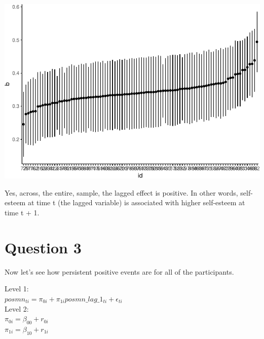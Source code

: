\documentclass[]{article}
\newenvironment{Shaded}{\begin{snugshade}}{\end{snugshade}}
\newcommand{\KeywordTok}[1]{\textcolor[rgb]{0.13,0.29,0.53}{\textbf{#1}}}
\newcommand{\DataTypeTok}[1]{\textcolor[rgb]{0.13,0.29,0.53}{#1}}
\newcommand{\FloatTok}[1]{\textcolor[rgb]{0.00,0.00,0.81}{#1}}
\newcommand{\StringTok}[1]{\textcolor[rgb]{0.31,0.60,0.02}{#1}}
\newcommand{\OperatorTok}[1]{\textcolor[rgb]{0.81,0.36,0.00}{\textbf{#1}}}
\newcommand{\NormalTok}[1]{#1}
\begin{document}
\includegraphics{Beck_HW_7_files/figure-latex/unnamed-chunk-4-1.pdf}

\begin{Shaded}
\end{Shaded}

Yes, across, the entire, sample, the lagged effect is positive. In other
words, self-esteem at time t (the lagged variable) is associated with
higher self-esteem at time t + 1.

\section{Question 3}\label{question-3}

Now let's see how persistent positive events are for all of the
participants.

Level 1:\\
\(posmn_{ti} = \pi_{0i} + \pi_{1i}posmn\_lag\_1_{ti} + \epsilon_{ti}\)\\
Level 2:\\
\(\pi_{0i} = \beta_{00} + r_{0i}\)\\
\(\pi_{1i} = \beta_{10} + r_{1i}\)
\end{document}
